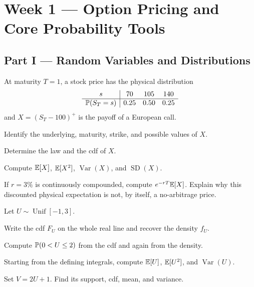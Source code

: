 
\section{Week 1 --- Option Pricing and Core Probability Tools}


\subsection*{Part I --- Random Variables and Distributions}

\begin{exercise}
At maturity $T=1$, a stock price has the physical distribution
\[
\begin{array}{c|ccc}
s & 70 & 105 & 140\\ \hline
\mathbb{P}(S_T=s) & 0.25 & 0.50 & 0.25
\end{array}
\]
and $X=(S_T-100)^+$ is the payoff of a European call.
\begin{exparts}
  \item Identify the underlying, maturity, strike, and possible values of $X$.
  \item Determine the law and the cdf of $X$.
  \item Compute $\mathbb{E}[X]$, $\mathbb{E}[X^2]$, $\operatorname{Var}(X)$, and
  $\operatorname{SD}(X)$.
  \item If $r=3\%$ is continuously compounded, compute $e^{-rT}\mathbb{E}[X]$.
  Explain why this discounted physical expectation is not, by itself, a
  no-arbitrage price.
\end{exparts}
\end{exercise}

\begin{exercise}
Let $U\sim\operatorname{Unif}[-1,3]$.
\begin{exparts}
  \item Write the cdf $F_U$ on the whole real line and recover the density $f_U$.
  \item Compute $\mathbb{P}(0<U\leq2)$ from the cdf and again from the density.
  \item Starting from the defining integrals, compute $\mathbb{E}[U]$, $\mathbb{E}[U^2]$,
  and $\operatorname{Var}(U)$.
  \item Set $V=2U+1$. Find its support, cdf, mean, and variance.
\end{exparts}
\end{exercise}

